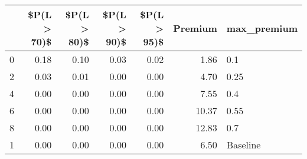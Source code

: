 \begin{tabular}{lrrrrrl}
\toprule
{} &  \$P(L > 70)\$ &  \$P(L > 80)\$ &  \$P(L > 90)\$ &  \$P(L > 95)\$ &  Premium & max\_premium \\
\midrule
0 &         0.18 &         0.10 &         0.03 &         0.02 &     1.86 &         0.1 \\
2 &         0.03 &         0.01 &         0.00 &         0.00 &     4.70 &        0.25 \\
4 &         0.00 &         0.00 &         0.00 &         0.00 &     7.55 &         0.4 \\
6 &         0.00 &         0.00 &         0.00 &         0.00 &    10.37 &        0.55 \\
8 &         0.00 &         0.00 &         0.00 &         0.00 &    12.83 &         0.7 \\
1 &         0.00 &         0.00 &         0.00 &         0.00 &     6.50 &    Baseline \\
\bottomrule
\end{tabular}
